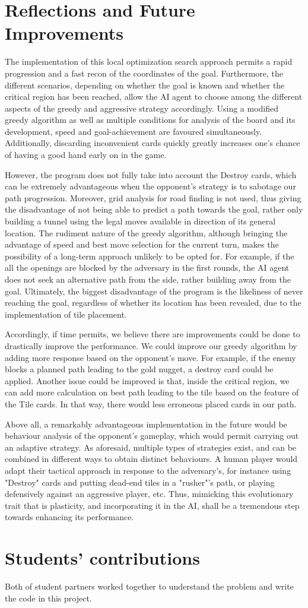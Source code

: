 \documentclass[12pt,twoside,letterpaper]{article}
\begin{document}
\section{Reflections and Future Improvements}
The implementation of this local optimization search approach permits a rapid progression and a fast recon of the coordinates of the goal. Furthermore, the different scenarios, depending on whether the goal is known and whether the critical region has been reached, allow the AI agent to choose among the different aspects of the greedy and aggressive strategy accordingly. Using a modified greedy algorithm as well as multiple conditions for analysis of the board and its development, speed and goal-achievement are favoured simultaneously. Additionally, discarding inconvenient cards quickly greatly increases one's chance of having a good hand early on in the game.
\par However, the program does not fully take into account the Destroy cards, which can be extremely advantageous when the opponent's strategy is to sabotage our path progression. Moreover, grid analysis for road finding is not used, thus giving the disadvantage of not being able to predict a path towards the goal, rather only building a tunnel using the legal moves available in direction of its general location. The rudiment nature of the greedy algorithm, although bringing the advantage of speed and best move selection for the current turn, makes the possibility of a long-term approach unlikely to be opted for. For example, if the all the openings are blocked by the adversary in the first rounds, the AI agent does not seek an alternative path from the side, rather building away from the goal. Ultimately, the biggest disadvantage of the program is the likeliness of never reaching the goal, regardless of whether its location has been revealed, due to the implementation of tile placement.
\par Accordingly, if time permits, we believe there are improvements could be done to drastically improve the performance. We could improve our greedy algorithm by adding more response based on the opponent's move. For example, if the enemy blocks a planned path leading to the gold nugget, a destroy card could be applied. Another issue could be improved is that, inside the critical region, we can add more calculation on best path leading to the tile based on the feature of the Tile cards. In that way, there would less erroneous placed cards in our path.
\par Above all, a remarkably advantageous implementation in the future would be behaviour analysis of the opponent's gameplay, which would permit carrying out an adaptive strategy. As aforesaid, multiple types of strategies exist, and can be combined in different ways to obtain distinct behaviours. A human player would adapt their tactical approach in response to the adversary's, for instance using "Destroy" cards and putting dead-end tiles in a "rusher"'s path, or playing defensively against an aggressive player, etc. Thus, mimicking this evolutionary trait that is plasticity, and incorporating it in the AI, shall be a tremendous step towards enhancing its performance.
\vfill
\section*{Students' contributions}
Both of student partners worked together to understand the problem and write the code in this project.
\end{document}
